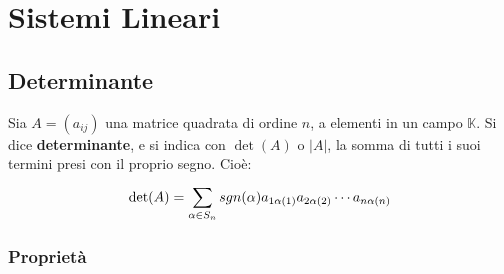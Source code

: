\documentclass[../main.tex]{subfiles}
\begin{document}
\section{Sistemi Lineari}
\subsection{Determinante}
Sia $A = (a_{ij})$ una matrice quadrata di ordine $n$, a elementi in un campo
$\mathbb{K}$. Si dice \textbf{determinante}, e si indica con $\det(A)$ o $|A|$,
la somma di tutti i suoi termini presi con il proprio segno. Cioè:
\[
    \det(A) = \sum_{\alpha\in S_n}^{}sgn(\alpha)a_{1\alpha(1)}a_{2\alpha(2)}\cdots a_{n\alpha(n)}
\]

\subsubsection{Proprietà}
\end{document}
